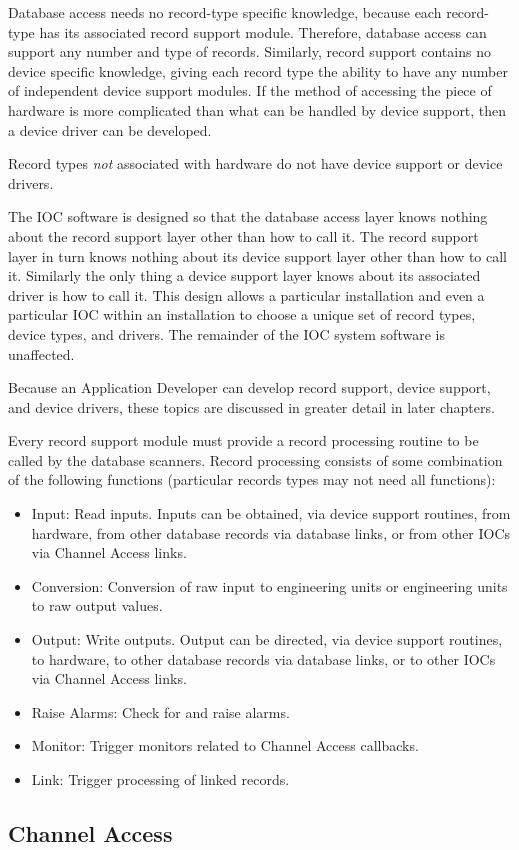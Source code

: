 Database access needs no record-type specific knowledge, because each record-type has its associated record support 
module. Therefore, database access can support any number and type of records. Similarly, record support contains no 
device specific knowledge, giving each record type the ability to have any number of independent device support 
modules. If the method of accessing the piece of hardware is more complicated than what can be handled by device 
support, then a device driver can be developed. 

Record types \emph{not} associated with hardware do not have device support or device drivers.

The IOC software is designed so that the database access layer knows nothing about the record support layer other than 
how to call it. The record support layer in turn knows nothing about its device support layer other than how to call it. 
Similarly the only thing a device support layer knows about its associated driver is how to call it. This design allows a 
particular installation and even a particular IOC within an installation to choose a unique set of record types, device types, 
and drivers. The remainder of the IOC system software is unaffected.

Because an Application Developer can develop record support, device support, and device drivers, these topics are 
discussed in greater detail in later chapters.

Every record support module must provide a record processing routine to be called by the database scanners. Record 
processing consists of some combination of the following functions (particular records types may not need all functions):

\begin{itemize}\item Input:  Read inputs. Inputs can be obtained, via device support routines, from hardware, from other database 
records via database links, or from other IOCs via Channel Access links.

\item Conversion:  Conversion of raw input to engineering units or engineering units to raw output values.

\item Output:  Write outputs. Output can be directed, via device support routines, to hardware, to other database records 
via database links, or to other IOCs via Channel Access links.

\item Raise Alarms:  Check for and raise alarms.

\item Monitor:  Trigger monitors related to Channel Access callbacks.

\item Link:  Trigger processing of linked records.

\end{itemize}\subsection{Channel Access}

